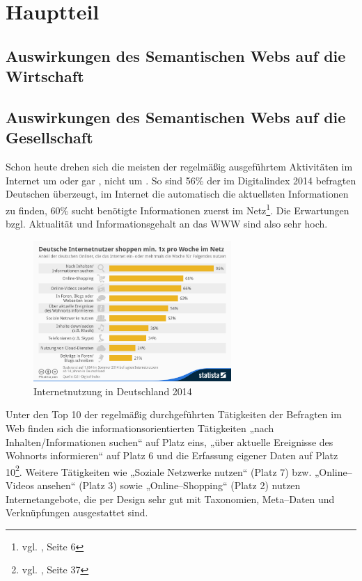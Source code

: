\section{Hauptteil}
\label{sec:hauptteil}

\subsection{Auswirkungen des Semantischen Webs auf die Wirtschaft}

\subsection{Auswirkungen des Semantischen Webs auf die Gesellschaft}

Schon heute drehen sich die meisten der regelmäßig ausgeführtem Aktivitäten im Internet um  oder gar , nicht um . So sind 56\% der im Digitalindex 2014 befragten Deutschen überzeugt, im Internet die automatisch die aktuellsten Informationen zu finden, 60\% sucht benötigte Informationen zuerst im Netz\footnote{vgl. \cite{d21}, Seite 6}. Die Erwartungen bzgl. Aktualität und Informationsgehalt an das \ac{WWW} sind also sehr hoch. 

\begin{figure}[H]
\begin{center}
\includegraphics[width=0.67\textwidth]{inetnutzung.jpg}
\caption[Internetnutzung in Deutschland 2014]{Internetnutzung in Deutschland 2014\protect\footnotemark}
\label{pic:inetnutzung}
\end{center}
\end{figure}


Unter den Top 10 der regelmäßig durchgeführten Tätigkeiten der Befragten im Web finden sich die informationsorientierten Tätigkeiten „nach Inhalten/Informationen suchen“ auf Platz eins, „über aktuelle Ereignisse des Wohnorts informieren“ auf Platz 6 und die Erfassung eigener Daten auf Platz 10\footnote{vgl. \cite{d21}, Seite 37}. Weitere Tätigkeiten wie „Soziale Netzwerke nutzen“ (Platz 7) bzw. „Online--Videos ansehen“ (Platz 3) sowie „Online--Shopping“ (Platz 2) nutzen Internetangebote, die per Design sehr gut mit Taxonomien, Meta--Daten und Verknüpfungen ausgestattet sind.

